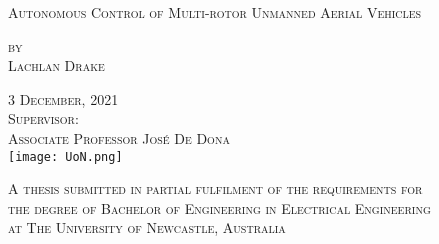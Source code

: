﻿%


\begin{titlepage}
\begin{center}
\pagenumbering{}

{\LARGE\textsc{Autonomous Control of Multi-rotor Unmanned Aerial Vehicles}\\}

\vspace{1cm}

\Large
\textsc{
by\\[0.5\baselineskip]
Lachlan Drake\\}

\vspace{1cm}
\textsc{3 December, 2021}\\ %

\vspace{1cm}
\textsc{Supervisor:\\
Associate Professor José De Dona}\\

\vspace{1cm}
\texttt{[image: UoN.png]}

\vspace{2cm}
\small\textsc{A thesis submitted in partial fulfilment of the requirements for\\ the degree of Bachelor of Engineering in Electrical Engineering\\ at The University of Newcastle, Australia}

\clearpage
\end{center}

\end{titlepage}
